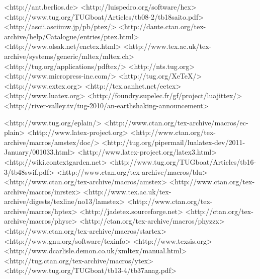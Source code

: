 	<http://ant.berlios.de>
	<http://luispedro.org/software/hex>
		<http://www.tug.org/TUGboat/Articles/tb08-2/tb18saito.pdf>
	<http://ascii.asciimw.jp/pb/ptex/>
	<http://dante.ctan.org/tex-archive/help/Catalogue/entries/ptex.html>
	<http://www.olsak.net/enctex.html>
	<http://www.tex.ac.uk/tex-archive/systems/generic/mltex/mltex.ch>
	<http://tug.org/applications/pdftex/>
	<http://nts.tug.org>
	<http://www.micropress-inc.com/>	
	<http://tug.org/XeTeX/>
	<http://www.extex.org>	
	<http://tex.aanhet.net/eetex>	
	<http://www.luatex.org>
	<http://foundry.supelec.fr/gf/project/luajittex/>
	<http://river-valley.tv/tug-2010/an-earthshaking-announcement>
	
	<http://www.tug.org/eplain/>
	<http://www.ctan.org/tex-archive/macros/ec-plain>
	<http://www.latex-project.org>
	<http://www.ctan.org/tex-archive/macros/amstex/doc/>
	<http://tug.org/pipermail/lualatex-dev/2011-January/001033.html>
	<http://www.latex-project.org/latex3.html>
	<http://wiki.contextgarden.net>
	<http://www.tug.org/TUGboat/Articles/tb16-3/tb48swif.pdf>
	<http://www.ctan.org/tex-archive/macros/blu>
	<http://www.ctan.org/tex-archive/macros/amstex>
	<http://www.ctan.org/tex-archive/macros/inrstex>
	<http://www.tex.ac.uk/tex-archive/digests/texline/no13/lamstex>
	<http://www.ctan.org/tex-archive/macros/hptex>
	<http://jadetex.sourceforge.net>
	<http://ctan.org/tex-archive/macros/physe>
	<http://ctan.org/tex-archive/macros/phyzzx>
	<http://www.ctan.org/tex-archive/macros/startex>
	<http://www.gnu.org/software/texinfo>
	<http://www.texsis.org>
	<http://www.dcarlisle.demon.co.uk/xmltex/manual.html>
	<http://tug.ctan.org/tex-archive/macros/ytex>
	<http://www.tug.org/TUGboat/tb13-4/tb37anag.pdf>

